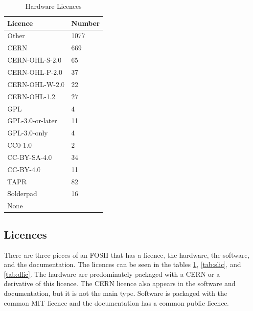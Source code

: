 \documentclass[final-report.tex]{subfiles}
\begin{document}
\begin{table}[h!]
        \centering
        \begin{tabular}{| l | l |}
        \toprule
                Licence & Number \\
        \midrule
        \midrule
            Other & 1077 \\
        \midrule
            CERN & 669 \\
            CERN-OHL-S-2.0 & 65 \\
            CERN-OHL-P-2.0 & 37 \\
            CERN-OHL-W-2.0 & 22 \\
            CERN-OHL-1.2 & 27 \\
        \midrule
            GPL & 4 \\
            GPL-3.0-or-later & 11 \\
            GPL-3.0-only & 4 \\
        \midrule
            CC0-1.0 & 2 \\
            CC-BY-SA-4.0 & 34 \\
            CC-BY-4.0 & 11 \\
        \midrule
            TAPR & 82 \\
            Solderpad & 16 \\
        \midrule
            None &  \\
        \bottomrule
        \end{tabular}
        \caption{Hardware Licences}
        \label{tab:hlic}
\end{table}

\subsection{Licences}
There are three pieces of an FOSH that has a licence, the hardware, the software, and the documentation.
The licences can be seen in the tables 
\ref{tab:hlic}, \ref{tab:slic}, and \ref{tab:dlic}.
The hardware are predominately packaged with a CERN or a derivative of this licence.
The CERN licence also appears in the software and documentation, but it is not the main type. 
Software is packaged with the common MIT licence and the documentation has a common public licence.
\end{document}
